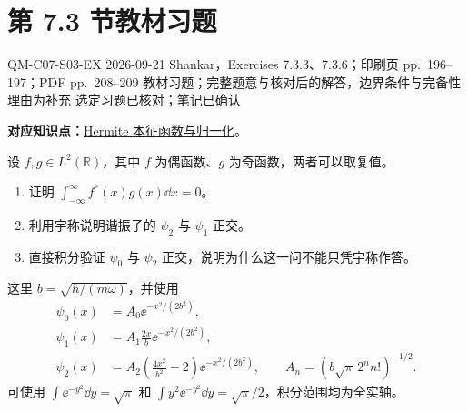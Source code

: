 \section{第 7.3 节教材习题}
\label{exercise-set:QM-C07-S03}
\exercisemeta
  {QM-C07-S03-EX}
  {2026-09-21}
  {Shankar，Exercises 7.3.3、7.3.6；印刷页 pp.~196--197；PDF pp.~208--209}
  {教材习题；完整题意与核对后的解答，边界条件与完备性理由为补充}
  {选定习题已核对；笔记已确认}

\textbf{对应知识点：}\hyperref[topic:QM-C07-S03-T03]{Hermite 本征函数与归一化}。

设 $f,g\in L^2(\mathbb R)$，其中 $f$ 为偶函数、$g$ 为奇函数，两者可以取复值。
\begin{enumerate}
  \item 证明 $\int_{-\infty}^{\infty}f^*(x)g(x)\dd x=0$。
  \item 利用宇称说明谐振子的 $\psi_2$ 与 $\psi_1$ 正交。
  \item 直接积分验证 $\psi_0$ 与 $\psi_2$ 正交，说明为什么这一问不能只凭宇称作答。
\end{enumerate}
这里 $b=\sqrt{\hbar/(m\omega)}$，并使用
\begin{align}
  \psi_0(x)&=A_0\ee^{-x^2/(2b^2)},\\
  \psi_1(x)&=A_1\frac{2x}{b}\ee^{-x^2/(2b^2)},\\
  \psi_2(x)&=A_2\left(\frac{4x^2}{b^2}-2\right)\ee^{-x^2/(2b^2)},
  \qquad A_n=(b\sqrt\pi\,2^n n!)^{-1/2}.
\end{align}
可使用 $\int\ee^{-y^2}\dd y=\sqrt\pi$ 和
$\int y^2\ee^{-y^2}\dd y=\sqrt\pi/2$，积分范围均为全实轴。

